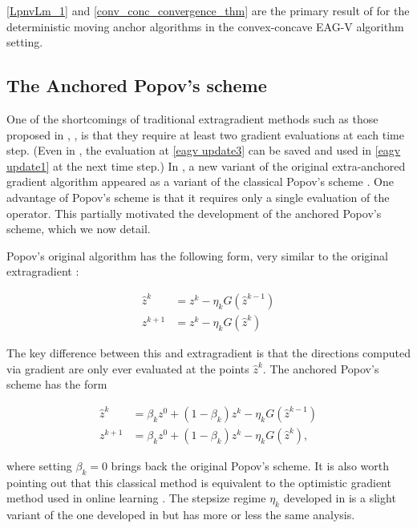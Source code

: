 \documentclass[11pt,reqno,oneside]{amsart}
\theoremstyle{definition}
\numberwithin{equation}{section}
\begin{document}
\cref{LpnvLm_1} and \cref{conv_conc_convergence_thm} are the primary result of \cite{alcala2023moving} for the deterministic moving anchor algorithms in the convex-concave EAG-V algorithm setting.

\subsection{The Anchored Popov's scheme}

One of the shortcomings of traditional extragradient methods such as those proposed in \cite{alcala2023moving}, \cite{yoon_ryu}, \cite{lee2021fast} is that they require at least two gradient evaluations at each time step.
(Even in \cite{alcala2023moving}, the evaluation at \cref{eagv update3} can be saved and used in \cref{eagv update1} at the next time step.)
In \cite{tran2021halpern}, a new variant of the original extra-anchored gradient algorithm \cite{yoon_ryu} appeared as a variant of the classical Popov's scheme \cite{popov1980modification}.
One advantage of Popov's scheme is that it requires only a single evaluation of the operator. %
This partially motivated the development of the anchored Popov's scheme, which we now detail.

Popov's original algorithm \cite{popov1980modification} has the following form, very similar to the original extragradient \cite{korpelevich1976extragradient}:

\begin{align*}
    \hat{z}^{k} &= z^{k} - \eta_{k}G(\hat{z}^{k-1}) \\
    z^{k+1} &= z^{k} - \eta_{k}G(\hat{z}^{k})
\end{align*}

The key difference between this and extragradient is that the directions computed via gradient are only ever evaluated at the points $\hat{z}^{k}$. The anchored Popov's scheme has the form 

\begin{align}
    \hat{z}^{k} &= \beta_{k}z^{0} + (1 - \beta_{k})z^{k} - \eta_{k}G(\hat{z}^{k-1}) \label{anch_pop_1}\\
    z^{k+1} &= \beta_{k}z^{0} + (1 - \beta_{k})z^{k} - \eta_{k}G(\hat{z}^{k}), \label{anch_pop_2}
\end{align}

where setting $\beta_{k} = 0$ brings back the original Popov's scheme. It is also worth pointing out that this classical method is equivalent to the optimistic gradient method used in online learning \cite{hsieh2019}.
The stepsize regime $\eta_{k}$ developed in \cite{tran2021halpern} is a slight variant of the one developed in \cite{yoon_ryu} but has more or less the same analysis.
\end{document}
